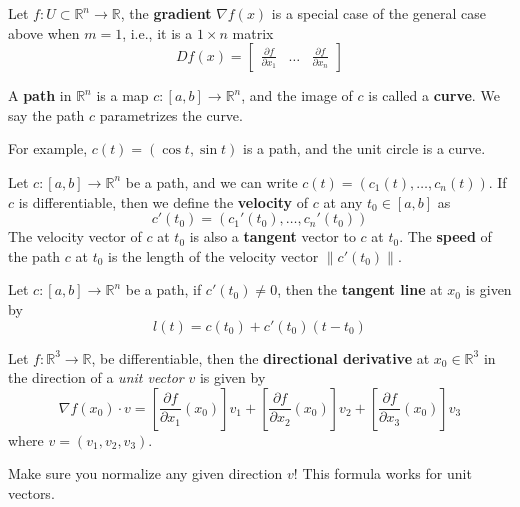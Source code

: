\documentclass[openany]{book}
\newcommand{\R}{\mathbb{R}}
\begin{document}
\begin{defn}[gradient]
    Let $f:U\subset\R^n\to\R$, the \textbf{gradient} $\nabla f(x)$ is a special case of the general case above when $m=1$, i.e., it is a $1\times n$ matrix 
    \begin{equation*}
        Df(x)=\begin{bmatrix}
            \frac{\partial f}{\partial x_1}&\dots&\frac{\partial f}{\partial x_n}
        \end{bmatrix}
    \end{equation*}
\end{defn}


\begin{defn}
    A \textbf{path} in $\R^n$ is a map $c:[a,b]\to\R^n$, and the image of $c$ is called a \textbf{curve}. We say the path $c$ parametrizes the curve. 

    \noindent For example, $c(t)=(\cos t, \sin t)$ is a path, and the unit circle is a curve.
\end{defn}


\begin{defn}
    Let $c:[a,b]\to\R^n$ be a path, and we can write $c(t)=(c_1(t), \dots, c_n(t))$. If $c$ is differentiable, then we define the \textbf{velocity} of $c$ at any $t_0\in [a,b]$ as 
    \begin{equation*}
        c'(t_0)=\left(c_1'(t_0), \dots, c_n'(t_0)\right)
    \end{equation*}
    The velocity vector of $c$ at $t_0$ is also a \textbf{tangent} vector to $c$ at $t_0$. The \textbf{speed} of the path $c$ at $t_0$ is the length of the velocity vector $\|c'(t_0)\|$.
\end{defn}

\begin{defn}\label{tangent path}
    Let $c:[a,b]\to\R^n$ be a path, if $c'(t_0)\neq 0$, then the \textbf{tangent line} at $x_0$ is given by 
    \begin{equation*}
        l(t)=c(t_0)+c'(t_0)(t-t_0)
    \end{equation*}
\end{defn}




\begin{defn}
    Let $f:\R^3\to\R$, be differentiable, then the \textbf{directional derivative} at $x_0\in\R^3$ in the direction of a \textit{unit vector} $v$ is given by 
    \begin{equation*}
        \nabla f(x_0)\cdot v=\left[\frac{\partial f}{\partial x_1}(x_0)\right]v_1+\left[\frac{\partial f}{\partial x_2}(x_0)\right]v_2+\left[\frac{\partial f}{\partial x_3}(x_0)\right]v_3
    \end{equation*}
    where $v=(v_1,v_2,v_3)$.
\end{defn}
\begin{warn}
    Make sure you normalize any given direction $v$! This formula works for unit vectors.
\end{warn}
\end{document}
